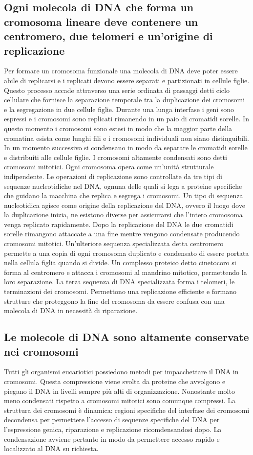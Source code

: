 \subsection{Ogni molecola di DNA che forma un cromosoma lineare deve contenere un centromero, due telomeri e un'origine di replicazione}
Per formare un cromosoma funzionale una molecola di DNA deve poter essere abile di replicarsi e i replicati devono essere separati e partizionati in cellule figlie. Questo processo 
accade attraverso una serie ordinata di passaggi detti ciclo cellulare che fornisce la separazione temporale tra la duplicazione dei cromosomi e la segregazione in due cellule figlie. 
Durante una lunga interfase i geni sono espressi e i cromosomi sono replicati rimanendo in un paio di cromatidi sorelle. In questo momento i cromosomi sono estesi in modo che la maggior
parte della cromatina esista come lunghi fili e i cromosomi individuali non siano distinguibili. In un momento successivo si condensano in modo da separare le cromatidi sorelle e 
distribuiti alle cellule figlie. I cromosomi altamente condensati sono detti cromosomi mitotici. Ogni cromosoma opera come un'unit\`a strutturale indipendente. Le operazioni di 
replicazione sono controllate da tre tipi di sequenze nucleotidiche nel DNA, ognuna delle quali si lega a proteine specifiche che guidano la macchina che replica e segrega i cromosomi.
Un tipo di sequenza nucleotidica agisce come origine della replicazione del DNA, ovvero il luogo dove la duplicazione inizia, ne esistono diverse per assicurarsi che l'intero cromosoma
venga replicato rapidamente. Dopo la replicazione del DNA le due cromatidi sorelle rimangono attaccate a una fine mentre vengono condensate producendo cromosomi mitotici. Un'ulteriore
sequenza specializzata detta centromero permette a una copia di ogni cromosoma duplicato e condensato di essere portata nella cellula figlia quando si divide. Un complesso proteico detto
cinetocoro si forma al centromero e attacca i cromosomi al mandrino mitotico, permettendo la loro separazione. La terza sequenza di DNA specializzata forma i telomeri, le terminazioni 
dei cromosomi. Permettono una replicazione efficiente e formano strutture che proteggono la fine del cromosoma da essere confusa con una molecola di DNA in necessit\`a di riparazione.
\subsection{Le molecole di DNA sono altamente conservate nei cromosomi}
Tutti gli organismi eucariotici possiedono metodi per impacchettare il DNA in cromosomi. Questa compressione viene svolta da proteine che avvolgono e piegano il DNA in livelli sempre 
pi\`u alti di organizzazione. Nonostante molto meno condensati rispetto a cromosomi mitotici sono comunque compressi. La struttura dei cromosomi \`e dinamica: regioni specifiche del
interfase dei cromosomi decondensa per permettere l'accesso di sequenze specifiche del DNA per l'espressione genica, riparazione e replicazione ricomdensandosi dopo. La condensazione 
avviene pertanto in modo da permettere accesso rapido e localizzato al DNA su richiesta.
